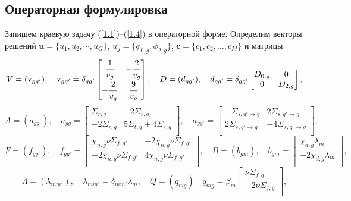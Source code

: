 \documentclass[a4paper,12pt]{article}
\begin{document}
\subsection{Операторная формулировка}
Запишем краевую задачу (\ref{1.1})--(\ref{1.4}) в операторной форме. 
Определим векторы решений $\bm u = \{u_1, u_2, \cdots, u_G\}$, $u_g = \{\phi_{0,g}, \phi_{2,g}\}$, $\bm c = \{c_1, c_2, ..., c_M\}$ и матрицы
\[
V = (\mathrm{v}_{gg'}),
\quad
\mathrm{v}_{gg'} =\delta_{gg'} \begin{bmatrix}
\cfrac{1}{v_g} & -\cfrac{2}{v_g} \\
-\cfrac{2}{v_g} & \cfrac{9}{v_g} \\
\end{bmatrix},
\quad
D = (d_{gg'}),
\quad
d_{gg'} = \delta_{gg'} \begin{bmatrix}
D_{0,g} & 0 \\
0 & D_{2,g} \\
\end{bmatrix},
\]
\[
A = (a_{gg'}),
\quad
a_{gg} = \begin{bmatrix}
\Sigma_{r,g} &  -2\Sigma_{r,g} \\
-2\Sigma_{r,g} & 5\Sigma_{t,g} + 4\Sigma_{r,g} \\
\end{bmatrix},
\quad
a_{gg'} = \begin{bmatrix}
-\Sigma_{s, g'\rightarrow g} & 2\Sigma_{s, g'\rightarrow g} \\
2\Sigma_{s, g'\rightarrow g} & -4\Sigma_{s, g'\rightarrow g} \\
\end{bmatrix},
\]
\[
F = (f_{gg'}),
\quad
f_{gg'} = \begin{bmatrix}
\chi_{n,g}\nu\Sigma_{f,g'} & -2\chi_{n,g}\nu\Sigma_{f,g'} \\
-2\chi_{n,g}\nu\Sigma_{f,g'} & 4\chi_{n,g}\nu\Sigma_{f,g'} \\
\end{bmatrix},
\quad
B =(b_{gm}),
\quad
b_{gm} = \begin{bmatrix}
\chi_{d,g}\lambda_m\\
-2\chi_{d,g}\lambda_m\\
\end{bmatrix},
\]
\[
\Lambda = (\lambda_{mm'}), 
\quad
\lambda_{mm'} = \delta_{mm'}\lambda_m,
\quad
Q = (q_{mg})
\quad
q_{mg} =\beta_m \begin{bmatrix}
\nu\Sigma_{f,g} \\
-2\nu\Sigma_{f,g} \\
\end{bmatrix},
\]
\end{document}
